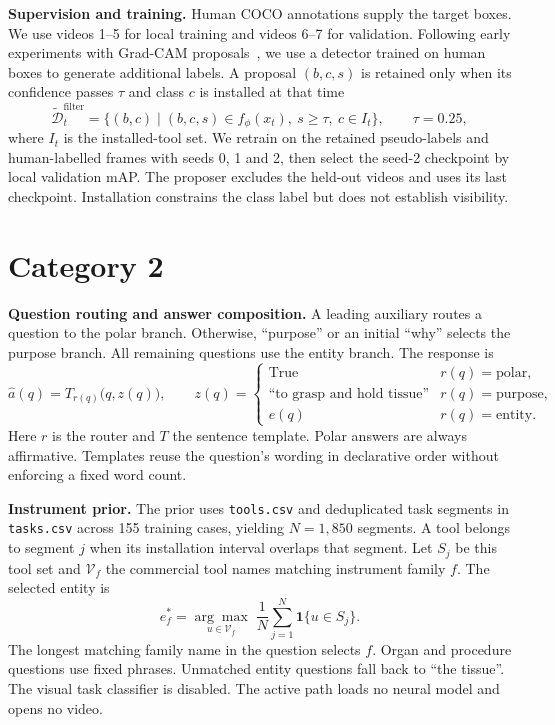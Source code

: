 \documentclass[10pt,a4paper]{article}
\begin{document}
\textbf{Supervision and training.}
Human COCO annotations supply the target boxes. We use videos 1--5 for local training and videos
6--7 for validation. Following early experiments with Grad-CAM proposals~\cite{gradcam}, we use a
detector trained on human boxes to generate additional labels. A proposal $(b,c,s)$ is retained only
when its confidence passes $\tau$ and class $c$ is installed at that time
\begin{equation}
\widetilde{\mathcal D}^{\mathrm{filter}}_t =
\bigl\{(b,c)\mid (b,c,s)\in f_\phi(x_t),\ s\geq\tau,\ c\in I_t\bigr\},
\qquad \tau=0.25,
\label{eq:filter}
\end{equation}
where $I_t$ is the installed-tool set. We retrain on the retained pseudo-labels and human-labelled
frames with seeds 0, 1 and 2, then select the seed-2 checkpoint by local validation mAP.
The proposer excludes the held-out videos and uses its last checkpoint. Installation constrains
the class label but does not establish visibility.

\section{Category 2}
\textbf{Question routing and answer composition.}
A leading auxiliary routes a question to the polar branch. Otherwise, ``purpose'' or an initial
``why'' selects the purpose branch. All remaining questions use the entity branch. The response is
\begin{equation}
\widehat a(q)=T_{r(q)}\bigl(q,z(q)\bigr),\qquad
z(q)=\begin{cases}
\mathrm{True} & r(q)=\mathrm{polar},\\
\text{``to grasp and hold tissue''} & r(q)=\mathrm{purpose},\\
e(q) & r(q)=\mathrm{entity}.
\end{cases}
\label{eq:answer}
\end{equation}
Here $r$ is the router and $T$ the sentence template. Polar answers are always affirmative.
Templates reuse the question's wording in declarative order without enforcing a fixed word count.

\textbf{Instrument prior.}
The prior uses \texttt{tools.csv} and deduplicated task segments in \texttt{tasks.csv}
across 155 training cases, yielding $N=1{,}850$ segments. A tool belongs to segment $j$ when its installation interval overlaps
that segment. Let $S_j$ be this tool set and $\mathcal V_f$ the commercial tool names matching
instrument family $f$. The selected entity is
\begin{equation}
e_f^*=\underset{u\in\mathcal V_f}{\arg\max}\;\frac{1}{N}
\sum_{j=1}^{N}\mathbf 1\{u\in S_j\}.
\label{eq:prior}
\end{equation}
The longest matching family name in the question selects $f$. Organ and procedure questions use
fixed phrases. Unmatched entity questions fall back to ``the tissue''. The visual task classifier is disabled. The active path loads no neural model and opens no video.
\end{document}
